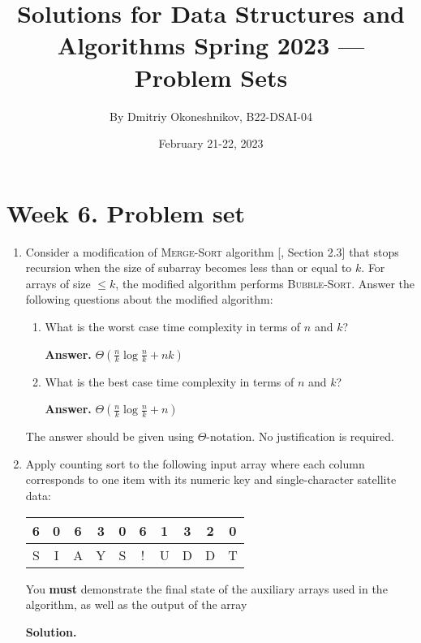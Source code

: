 \documentclass{article}
\title{Solutions for Data Structures and Algorithms Spring 2023 — Problem Sets}
\author{By Dmitriy Okoneshnikov, B22-DSAI-04}
\date{February 21-22, 2023}
\begin{document}
\maketitle

\section*{Week 6. Problem set}

\begin{enumerate}
    \item Consider a modification of \textsc{Merge-Sort} algorithm [, Section 2.3] that stops recursion when the size of subarray becomes less than or equal to $k$. For arrays of size $\leq k$, the modified algorithm performs \textsc{Bubble-Sort}. Answer the following questions about the modified algorithm:
    \begin{enumerate}
        \item What is the worst case time complexity in terms of $n$ and $k$?

        \textbf{Answer.} $\Theta(\frac{n}{k}\log{\frac{n}{k}} + nk)$
        
        \item What is the best case time complexity in terms of $n$ and $k$?

        \textbf{Answer.} $\Theta(\frac{n}{k}\log{\frac{n}{k}} + n)$
    \end{enumerate}

    The answer should be given using $\Theta$-notation. No justification is required.

    \item Apply counting sort to the following input array where each column corresponds to one item with its numeric key and single-character satellite data:
    \begin{center}
        \begin{tabular}{|c|c|c|c|c|c|c|c|c|c|}
            \hline
             6 & 0 & 6 & 3 & 0 & 6 & 1 & 3 & 2 & 0 \\
             \hline
             S & I & A & Y & S & ! & U & D & D & T \\
             \hline
        \end{tabular}
    \end{center}

    You \textbf{must} demonstrate the final state of the auxiliary arrays used in the algorithm, as well as the output of the array

    \textbf{Solution.}


\end{enumerate}
\end{document}
